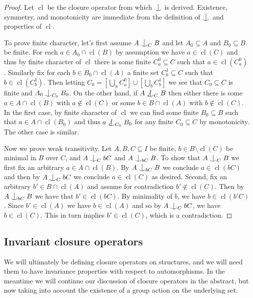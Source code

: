 \documentclass[12pt]{amsart}
\theoremstyle{plain}
\theoremstyle{definition}
\DeclareMathOperator{\cl}{cl}
\newcommand{\forkindep}[1][]{%
  \mathrel{
    \mathop{
      \vcenter{
        \hbox{\oalign{\noalign{\kern-.3ex}\hfil$\vert$\hfil\cr
              \noalign{\kern-.7ex}
              $\smile$\cr\noalign{\kern-.3ex}}}
      }
    }\displaylimits_{#1}
  }
}
\begin{document}
\begin{proof}
Let $\cl$ be the closure operator from which $\forkindep$ is derived.
Existence, symmetry, and monotonicity are immediate from the definition of $\forkindep$ and properties of $\cl$.

To prove finite character, let's first assume $A \forkindep[C] B$ and let $A_0 \subseteq A$ and $B_0 \subseteq B$ be finite.
For each $a \in A_0 \cap \cl(B)$ by assumption we have $a \in \cl(C)$ and thus by finite character of $\cl$ there is some finite $C^0_a \subseteq C$ such that $a \in \cl(C^0_a)$.
Similarly fix for each $b \in B_0 \cap \cl(A)$ a finite set $C^1_b \subseteq C$ such that $b \in \cl(C^1_b)$.
Then letting $C_0 = [\bigcup_{a} C^0_a] \cup [\bigcup_{b} C^1_b]$ we see that $C_0 \subseteq C$ is finite and $A_0 \forkindep[C_0] B_0$.
On the other hand, if $A \not\forkindep[C] B$ then either there is some $a \in A \cap \cl(B)$ with $a \not\in \cl(C)$ or some $b \in B \cap \cl(A)$ with $b \not\in \cl(C)$.
In the first case, by finite character of $\cl$ we can find some finite $B_0 \subseteq B$ such that $a \in A \cap \cl(B_0)$ and thus $a \not\forkindep[C_0] B_0$ for any finite $C_0 \subseteq C$ by monotonicity.
The other case is similar.

Now we prove weak transitivity.
Let $A, B, C \subseteq I$ be finite, $b \in B \setminus \cl(C)$ be minimal in $B$ over $C$, and $A \forkindep[C] bC$ and $A \forkindep[bC] B$.
To show that $A \forkindep[C] B$ we first fix an arbitrary $a \in A \cap \cl(B)$. By $A \forkindep[bC] B$ we conclude $a \in \cl(bC)$ and then by $A \forkindep[C] bC$ we conclude $a \in \cl(C)$ as desired. 
Second, fix an arbitrary $b' \in B \cap \cl(A)$ and assume for contradiction $b' \not\in \cl(C)$. 
Then by $A \forkindep[bC] B$ we have that $b' \in \cl(bC)$. 
By minimality of $b$, we have $b \in \cl(b'C)$.
Since $b' \in \cl(A)$ we have $b \in \cl(A)$ and so by $A \forkindep[C] bC$, we have $b \in \cl(C)$.
This in turn implies $b' \in \cl(C)$, which is a contradiction.
\end{proof}

\subsection{Invariant closure operators}

We will ultimately be defining closure operators on structures, and we will need them to have invariance properties with respect to automorphisms.
In the meantime we will continue our discussion of closure operators in the abstract, but now taking into account the existence of a group action on the underlying set.
\end{document}
